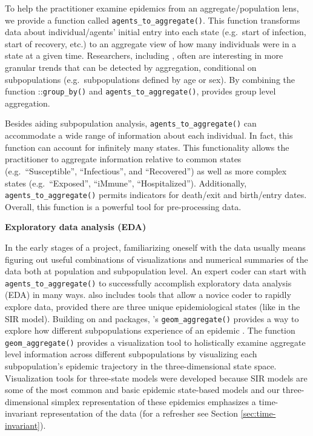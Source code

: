 \documentclass[
  shortnames]{jss}
\begin{document}
To help the practitioner examine epidemics from an aggregate/population
lens, we provide a function called \texttt{agents\_to\_aggregate()}.
This function transforms data about individual/agents' initial entry
into each state (e.g.~start of infection, start of recovery, etc.) to an
aggregate view of how many individuals were in a state at a given time.
Researchers, including \citet{rvachev1985,anderson1992,worby2015}, often
are interesting in more granular trends that can be detected by
aggregation, conditional on subpopulations (e.g.~subpopulations defined
by age or sex). By combining the function
::\texttt{group\_by()} and \texttt{agents\_to\_aggregate()},
 provides group level aggregation.

Besides aiding subpopulation analysis, \texttt{agents\_to\_aggregate()}
can accommodate a wide range of information about each individual. In
fact, this function can account for infinitely many states. This
functionality allows the practitioner to aggregate information relative
to common states (e.g.~``Susceptible'', ``Infectious'', and
``Recovered'') as well as more complex states (e.g.~``Exposed'',
``iMmune'', ``Hospitalized''). Additionally,
\texttt{agents\_to\_aggregate()} permits indicators for death/exit and
birth/entry dates. Overall, this function is a powerful tool for
pre-processing data.

\textbf{Exploratory data analysis (EDA)}

In the early stages of a project, familiarizing oneself with the data
usually means figuring out useful combinations of visualizations and
numerical summaries of the data both at population and subpopulation
level. An expert coder can start with \texttt{agents\_to\_aggregate()}
to successfully accomplish exploratory data analysis (EDA) in many ways.
 also includes tools that allow a novice coder to
rapidly explore data, provided there are three unique epidemiological
states (like in the SIR model). Building on  and
 packages, 's \texttt{geom\_aggregate()}
provides a way to explore how different subpopulations experience of an
epidemic \citep{Wickham2016, Hamilton2018}. The function
\texttt{geom\_aggregate()} provides a visualization tool to holistically
examine aggregate level information across different subpopulations by
visualizing each subpopulation's epidemic trajectory in the
three-dimensional state space. Visualization tools for three-state
models were developed because SIR models are some of the most common and
basic epidemic state-based models and our three-dimensional simplex
representation of these epidemics emphasizes a time-invariant
representation of the data (for a refresher see Section
\ref{sec:time-invariant}).
\end{document}
